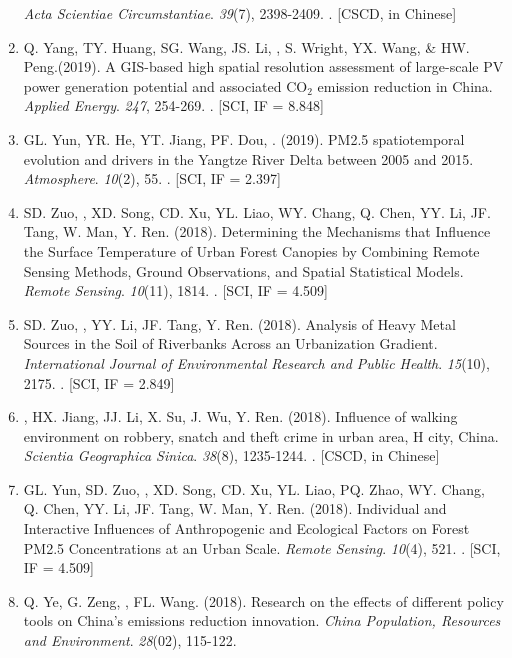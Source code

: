 \begin{enumerate}
    \textit{Acta Scientiae Circumstantiae}. \textit{39}(7), 2398-2409.
    . [CSCD, in Chinese] 
\item
    Q. Yang, TY. Huang, SG. Wang, JS. Li, \Shaoqing, S. Wright, YX. Wang, \& HW. Peng.(2019).
    A GIS-based high spatial resolution assessment of large-scale PV power generation potential and associated CO$_2$ emission reduction in China.
    \textit{Applied Energy}. \textit{247}, 254-269.
    . [SCI, IF = 8.848]
\item
    GL. Yun, YR. He, YT. Jiang, PF. Dou, \Shaoqing. (2019).
    PM2.5 spatiotemporal evolution and drivers in the Yangtze River Delta between 2005 and 2015.
    \textit{Atmosphere}. \textit{10}(2), 55.
    . [SCI, IF = 2.397]
\item
    SD. Zuo, \Shaoqing, XD. Song, CD. Xu, YL. Liao, WY. Chang, Q. Chen, YY. Li, JF. Tang, W. Man, Y. Ren. (2018).
    Determining the Mechanisms that Influence the Surface Temperature of Urban Forest Canopies by Combining Remote Sensing Methods, Ground Observations, and Spatial Statistical Models. 
    \textit{Remote Sensing}. \textit{10}(11), 1814.
    . [SCI, IF = 4.509]
\item
    SD. Zuo, \Shaoqing, YY. Li, JF. Tang, Y. Ren. (2018).
	Analysis of Heavy Metal Sources in the Soil of Riverbanks Across an Urbanization Gradient.
    \textit{International Journal of Environmental Research and Public Health}. \textit{15}(10), 2175.
    . [SCI, IF = 2.849]
\item
    \Shaoqing, HX. Jiang, JJ. Li, X. Su, J. Wu, Y. Ren. (2018).
	Influence of walking environment on robbery, snatch and theft crime in urban area, H city, China.
    \textit{Scientia Geographica Sinica}.  \textit{38}(8), 1235-1244.
    . [CSCD, in Chinese]
\item
    GL. Yun, SD. Zuo, \Shaoqing, XD. Song, CD. Xu, YL. Liao, PQ. Zhao, WY. Chang, Q. Chen, YY. Li, JF. Tang, W. Man, Y. Ren. (2018).
	Individual and Interactive Influences of Anthropogenic and Ecological Factors on Forest PM2.5 Concentrations at an Urban Scale.
    \textit{Remote Sensing}. \textit{10}(4), 521.
    . [SCI, IF = 4.509]
\item
    Q. Ye, G. Zeng, \Shaoqing, FL. Wang. (2018).
	Research on the effects of different policy tools on China’s emissions reduction innovation.
    \textit{China Population, Resources and Environment}. \textit{28}(02), 115-122.

\end{enumerate}
